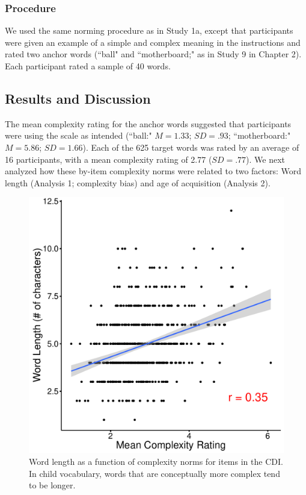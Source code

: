 \subsubsection{Procedure} We used the same norming procedure as in Study 1a, except that participants were given an example of a simple and complex meaning in the instructions and  rated two anchor words (``ball" and ``motherboard;" as in Study 9 in Chapter 2). Each participant rated a sample of 40 words. 

\subsection{Results and Discussion}
The mean complexity rating for the anchor words suggested that participants were using the scale as intended (``ball:" $M =1.33$; $SD = .93$; ``motherboard:" $M = 5.86$; $SD = 1.66$). Each of the 625 target words  was rated by an average of 16 participants, with a mean complexity rating of 2.77 ($SD = .77$). We next analyzed how these by-item complexity norms were related to two factors: Word length (Analysis 1; complexity bias) and age of acquisition (Analysis 2). 

\begin{figure}[t!]
\begin{center}
\includegraphics[scale = .5]{figs/chap4_3.pdf}
\end{center}
\caption{Word length as a function of complexity norms for items in the CDI. In child vocabulary, words that are conceptually more complex tend to be longer.}
\label{fig:study3}
\end{figure}

